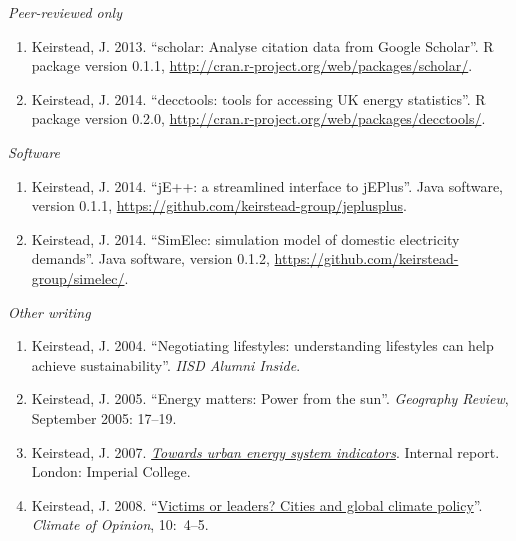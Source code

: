 \documentclass[11pt,a4paper]{article}
\newcommand{\marginhead}[1]{\marginpar{\textsf{{\footnotesize #1}}}}
\begin{document}
\noindent\marginhead{Software}%
% 
\emph{Peer-reviewed only}

\begin{enumerate}
\item Keirstead, J. 2013. ``scholar: Analyse citation data from Google Scholar''. R package version 0.1.1, \url{http://cran.r-project.org/web/packages/scholar/}.

\item Keirstead, J. 2014. ``decctools: tools for accessing UK energy statistics''. R package version 0.2.0, \url{http://cran.r-project.org/web/packages/decctools/}.
\end{enumerate}



 \bigskip

\noindent\marginhead{Non-peer\\reviewed}
%
% 
\emph{Software}
\medskip
\begin{enumerate}
\item Keirstead, J. 2014. ``jE++: a streamlined interface to jEPlus''. Java software, version 0.1.1, \url{https://github.com/keirstead-group/jeplusplus}.

\item Keirstead, J. 2014. ``SimElec: simulation model of domestic electricity demands''. Java software, version 0.1.2, \url{https://github.com/keirstead-group/simelec/}.
\end{enumerate}

\emph{Other writing}

\begin{enumerate}
\item Keirstead, J. 2004. ``Negotiating lifestyles: understanding lifestyles can help achieve sustainability''. \emph{IISD Alumni Inside}.

\item Keirstead, J. 2005. ``Energy matters: Power from the sun''.  \emph{Geography Review}, September 2005: 17--19.

\item Keirstead, J. 2007.  \href{http://www3.imperial.ac.uk/pls/portallive/docs/1/24897696.PDF}{\emph{Towards urban energy system indicators}}.  Internal report. London: Imperial College.

\item Keirstead, J. 2008. ``\href{http://www.stockholm-network.org/downloads/publications/Climate_of_Opinion_10.pdf}{Victims or leaders? Cities and global climate policy}''. \emph{Climate of Opinion}, 10:~4--5.

\end{enumerate}
\end{document}
